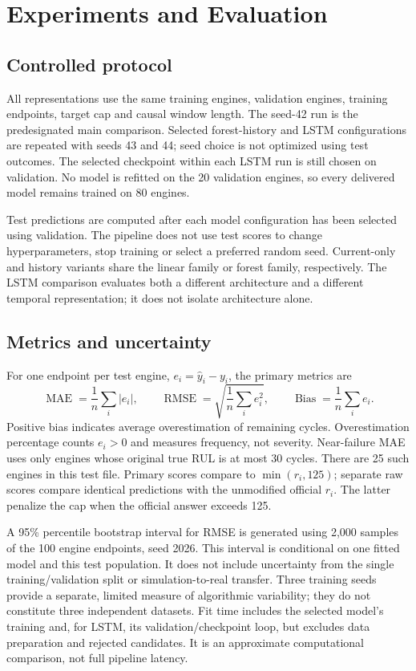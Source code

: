 \documentclass[11pt]{article}
\begin{document}
\section{Experiments and Evaluation}
\subsection{Controlled protocol}
All representations use the same training engines, validation engines, training endpoints, target cap and causal window length. The seed-42 run is the predesignated main comparison. Selected forest-history and LSTM configurations are repeated with seeds 43 and 44; seed choice is not optimized using test outcomes. The selected checkpoint within each LSTM run is still chosen on validation. No model is refitted on the 20 validation engines, so every delivered model remains trained on 80 engines.

Test predictions are computed after each model configuration has been selected using validation. The pipeline does not use test scores to change hyperparameters, stop training or select a preferred random seed. Current-only and history variants share the linear family or forest family, respectively. The LSTM comparison evaluates both a different architecture and a different temporal representation; it does not isolate architecture alone.

\subsection{Metrics and uncertainty}
For one endpoint per test engine, $e_i=\hat y_i-y_i$, the primary metrics are
\begin{equation}
 \operatorname{MAE}=\frac{1}{n}\sum_i|e_i|,\qquad
 \operatorname{RMSE}=\sqrt{\frac{1}{n}\sum_i e_i^2},\qquad
 \operatorname{Bias}=\frac{1}{n}\sum_i e_i.
\end{equation}
Positive bias indicates average overestimation of remaining cycles. Overestimation percentage counts $e_i>0$ and measures frequency, not severity. Near-failure MAE uses only engines whose original true RUL is at most 30 cycles. There are 25 such engines in this test file. Primary scores compare to $\min(r_i,125)$; separate raw scores compare identical predictions with the unmodified official $r_i$. The latter penalize the cap when the official answer exceeds 125.

A 95\% percentile bootstrap interval for RMSE is generated using 2,000 samples of the 100 engine endpoints, seed 2026. This interval is conditional on one fitted model and this test population. It does not include uncertainty from the single training/validation split or simulation-to-real transfer. Three training seeds provide a separate, limited measure of algorithmic variability; they do not constitute three independent datasets. Fit time includes the selected model's training and, for LSTM, its validation/checkpoint loop, but excludes data preparation and rejected candidates. It is an approximate computational comparison, not full pipeline latency.
\end{document}
